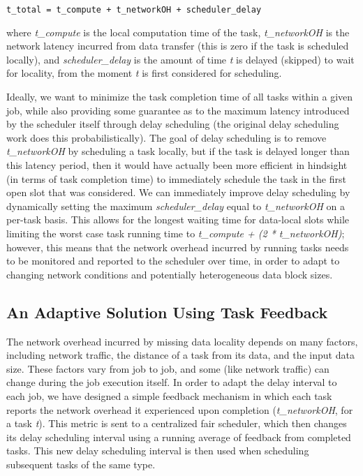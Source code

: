 \documentclass[10pt,conference,compsocconf,letterpaper]{IEEEtran}
\begin{document}
\texttt{t\_total = t\_compute + t\_networkOH + scheduler\_delay} \newline

where \textit{t\_compute} is the local computation time of the task, \textit{t\_networkOH}
is the network latency incurred from data transfer (this is zero if the task is scheduled 
locally), and \textit{scheduler\_delay} is the amount of time \textit{t} is delayed 
(skipped) to wait for locality, from the moment \textit{t} is first considered for 
scheduling.

Ideally, we want to minimize the task completion time of all tasks within a given job, 
while also providing some guarantee as to the maximum latency introduced by the scheduler
itself through delay scheduling (the original delay scheduling work does this 
probabilistically). The goal of delay scheduling is to remove \textit{t\_networkOH} by 
scheduling a task locally, but if the task is delayed longer than this latency period, 
then it would have actually been more efficient in hindsight (in terms of task completion time) to immediately schedule the task in the first open slot that was considered. We can 
immediately improve delay scheduling by dynamically setting the maximum 
\textit{scheduler\_delay} equal to \textit{t\_networkOH} on a per-task basis. This allows 
for the longest waiting time for data-local slots while limiting the worst case task 
running time to \textit{t\_compute + (2 * t\_networkOH)}; however, this means that the 
network overhead incurred by running tasks needs to be monitored and reported to the 
scheduler over time, in order to adapt to changing network conditions and potentially 
heterogeneous data block sizes. 

\subsection{An Adaptive Solution Using Task Feedback}

The network overhead incurred by missing data locality depends on many factors, including 
network traffic, the distance of a task from its data, and the input data size. These 
factors vary from job to job, and some (like network traffic) can change during the job 
execution itself. In order to adapt the delay interval to each job, we have designed a 
simple feedback mechanism in which each task reports the network overhead it experienced 
upon completion (\textit{t\_networkOH}, for a task \textit{t}). This metric is sent to a 
centralized fair scheduler, which then changes its delay scheduling interval using a 
running average of feedback from completed tasks. This new delay scheduling interval is 
then used when scheduling subsequent tasks of the same type.
\end{document}
